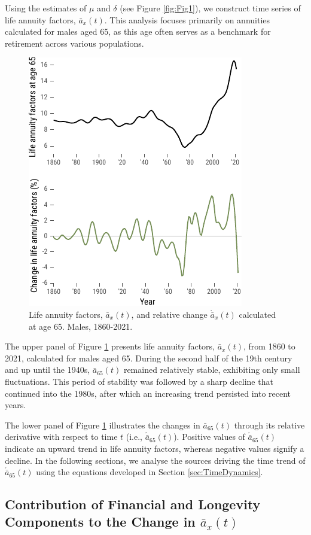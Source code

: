 \documentclass[12pt]{article}
\begin{document}
Using the estimates of \(\mu\) and \(\delta\) (see Figure \ref{fig:Fig1}), we construct time series of life annuity factors, \( \bar{a}_x(t) \). This analysis focuses primarily on annuities calculated for males aged 65, as this age often serves as a benchmark for retirement across various populations.

 \begin{figure}[H]
	\centering
	\includegraphics[width=0.5\linewidth]{Fig/lifeAnnuityFactorsAndChanges}
	\caption{{Life annuity factors, $\bar{a}_x(t)$, and relative change $\acute{\bar{a}}_x(t)$ calculated at age 65. Males, 1860-2021.}}
	\label{fig:Fig2}
\end{figure}


The upper panel of Figure \ref{fig:Fig2} presents life annuity factors, \( \bar{a}_x(t) \), from 1860 to 2021, calculated for males aged 65. During the second half of the 19th century and up until the 1940s, \( \bar{a}_{65}(t) \) remained relatively stable, exhibiting only small fluctuations. This period of stability was followed by a sharp decline that continued into the 1980s, after which an increasing trend persisted into recent years. 

The lower panel of Figure \ref{fig:Fig2} illustrates the changes in \( \bar{a}_{65}(t) \) through its relative derivative with respect to time \( t \) (i.e., \( \acute{\bar{a}}_{65}(t) \)). Positive values of \( \acute{\bar{a}}_{65}(t) \) indicate an upward trend in life annuity factors, whereas negative values signify a decline. In the following sections, we analyse the sources driving the time trend of \( \acute{\bar{a}}_{65}(t) \) using the equations developed in Section \ref{sec:TimeDynamics}.



\subsection{Contribution of Financial and Longevity Components to the Change in $\bar{a}_x(t)$}
\end{document}
